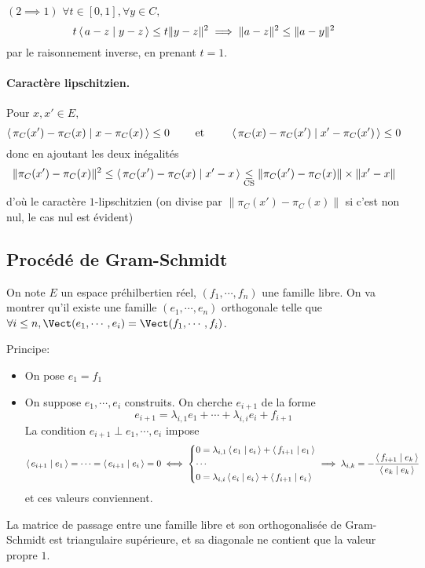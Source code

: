 $(2 \implies  1)$ $\forall  t \in  [0, 1], \forall  y \in  C,$ \[
    t\scalar{a-z}{y-z} \leq t \|y-z\|^2 \implies   \|a-z\|^2 \leq  \|a-y\|^2 
\] 
par le raisonnement inverse, en prenant $t=1$.

\paragraph{Caractère lipschitzien.} 
Pour $x, x' \in  E,$ \[
    \scalar{\pi_C(x')-\pi_C(x)}{x-\pi_C(x)} \leq 0 \qquad  \text{ et } \qquad  \scalar{\pi_C(x)-\pi_C(x')}{x'-\pi_C(x')} \leq 0
\] 
donc en ajoutant les deux inégalités \[
    \|\pi_C(x')-\pi_C(x)\|^2 \leq \scalar{\pi_C(x')-\pi_C(x)}{x'-x} \underset{\text{CS}}\leq \|\pi_C(x')-\pi_C(x)\|\times \|x'-x\|
\] 
d'où le caractère $1$-lipschitzien (on divise par $\|\pi_C(x')-\pi_C(x)\|$ si c'est non nul, le cas nul est évident)

\subsection{Procédé de Gram-Schmidt}

On note $E$ un espace préhilbertien réel,  $(f_1, \cdots , f_n)$ une famille libre. On va montrer qu'il existe une famille $(e_1, \cdots , e_n)$ orthogonale telle que $\forall  i \leq n, \Vect(e_1, \cdots , e_i)=\Vect(f_1, \cdots , f_i)$.

Principe: \begin{itemize}
    \item On pose $e_1=f_1$
    \item On suppose  $e_1, \cdots , e_i$ construits. On cherche $e_{i+1}$ de la forme \[
    e_{i+1}=\lambda_{i,1}e_1+\cdots +\lambda_{i,i}e_i+f_{i+1}
    \] 
    La condition $e_{i+1}\perp e_1, \cdots , e_i$ impose \[
        \scalar{e_{i+1}}{e_1} = \cdots =\scalar{e_{i+1}}{e_i} =0 \iff  \begin{dcases}
            0=\lambda_{i,1} \scalar{e_1}{e_i} + \scalar{f_{i+1}}{e_1} \\
            \cdots \\
            0=\lambda_{i,i}\scalar{e_i}{e_i} +\scalar{f_{i+1}}{e_i} 
        \end{dcases} \implies \lambda_{i,k}=- \frac{\scalar{f_{i+1}}{e_k} }{\scalar{e_k}{e_k} }
    \] 
    et ces valeurs conviennent.
\end{itemize}

\begin{rem}
La matrice de passage entre une famille libre et son orthogonalisée de Gram-Schmidt est triangulaire supérieure, et sa diagonale ne contient que la valeur propre $1$.
\end{rem}

